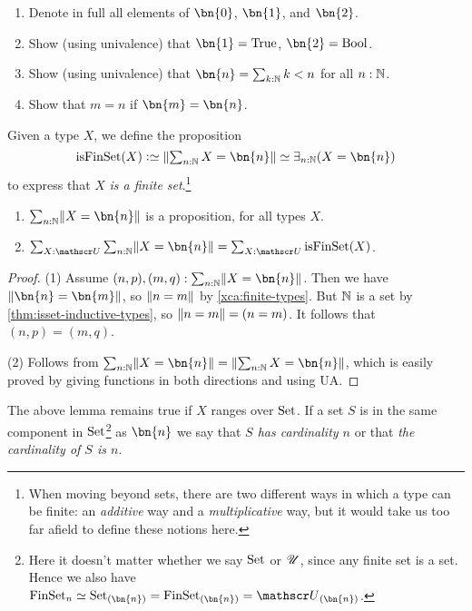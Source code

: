 \begin{xca}\label{xca:finite-types}
\hspace{1in}
  \begin{enumerate}
  \item Denote in full all elements of $\bn{0}$, $\bn{1} $, and $\bn{2}$.
  \item Show (using univalence) that $\bn{1} =\true$, $\bn{2} =\bool$.
  \item Show (using univalence) that $\bn{n} = \sum_{k:\NN} k<n$ for all $n:\mathbb{N}$.
  \item Show that $m=n$ if $\bn{m}=\bn{n}$.\qedhere
  \end{enumerate}
\end{xca}
\begin{definition}\label{def:is-finite}
  Given a type $X$, we define the proposition
  \[
    \textstyle
    \isfinset(X) \defeq \Trunc*{\sum_{n:\NN}X=\bn{n}}
    \jdeq \exists_{n:\NN}(X=\bn{n})
  \]
  to express that $X$ \emph{is a finite set}.\footnote{%
    When moving beyond sets, there are two different ways
    in which a type can be finite: an \emph{additive}
    way and a \emph{multiplicative} way, but
    it would take us too far afield to define these notions
    here.} %
\end{definition}
\begin{lemma}\label{lem:maxonefinitetype}
\leavevmode
\begin{enumerate}
  \item $\sum_{n:\NN}\Trunc{X=\bn{n}}$ is a proposition, for all types $X$.
  \item
$\sum_{X:\UU}\sum_{n:\NN}\Trunc{X=\bn{n}} =\sum_{X:\UU}\isfinset(X)$.
  \end{enumerate}
\end{lemma}
\begin{proof}

(1) Assume $(n,p),(m,q): \sum_{n:\NN}\Trunc{X=\bn{n}}$.
Then we have $\Trunc{\bn{n}=\bn{m}}$, so $\lVert n=m\rVert$
by \cref{xca:finite-types}. But $\mathbb{N}$ is a set by \cref{thm:isset-inductive-types},
so $\lVert n=m\rVert=(n=m)$. It follows that $(n,p)=(m,q)$.

(2) Follows from $\sum_{n:\NN}\Trunc{X=\bn{n}} =\Trunc{\sum_{n:\NN}X=\bn{n}}$,
which is easily proved by giving functions in both directions and using UA.
\end{proof}

The above lemma remains true if $X$ ranges over $\mathrm{Set}$.
If a set $S$ is in the same component in $\mathrm{Set}$\footnote{%
  Here it doesn't matter whether we say $\mathrm{Set}$ or ${\mathscr{U}}$,
  since any finite set is a set.
  Hence we also have $\FinSet_n
  \jdeq \Set_{(\bn{n})} = \FinSet_{(\bn{n})}
  = \UU_{(\bn{n})}$.}
as $\bn{n}$ we say that \emph{$S$ has cardinality $n$} or that \emph{the cardinality of $S$ is $n$}.

